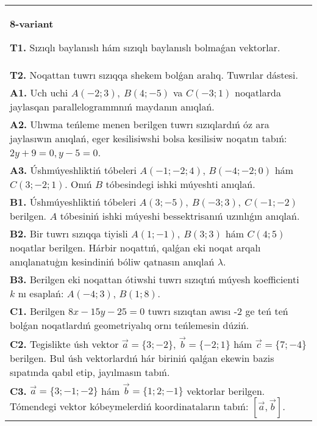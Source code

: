 \documentclass{article}
\begin{document}
\begin{tabular}{m{17cm}}
\textbf{8-variant}

\textbf{T1.} 
Sızıqlı baylanıslı hám sızıqlı baylanıslı bolmaǵan vektorlar.
 \\
\textbf{T2.} 
Noqattan tuwrı sızıqqa shekem bolǵan aralıq. Tuwrılar dástesi.
 \\
\textbf{A1.} 
Uch uchi $A (-2;3), \ B (4;-5) $ va
$C (-3;1)$ noqatlarda jaylasqan parallelogrammnıń maydanın anıqlań.
 \\
\textbf{A2.} 
Ulıwma teńleme menen berilgen tuwrı sızıqlardıń
óz ara jaylasıwın anıqlań, eger kesilisiwshi bolsa kesilisiw noqatın
tabıń: $2y+9=0, y-5=0$.
 \\
\textbf{A3.} 
Úshmúyeshliktiń tóbeleri
$A (- 1; - 2;4) $, $B (- 4; - 2;0) $ hám $C (3; -2;1) $. Onıń $B$ tóbesindegi
ishki múyeshti anıqlań.
 \\
\textbf{B1.} 
Úshmúyeshliktiń tóbeleri
\(A (3;-5),\ B (-3;3),\ C (-1;-2) \) berilgen. $A$ tóbesiniń ishki
múyeshi bessektrisanıń uzınlıǵın anıqlań.
 \\
\textbf{B2.} 
Bir tuwrı sızıqqa tiyisli \(A (1;-1),\ B (3;3) \) hám
\(C (4;5) \) noqatlar berilgen. Hárbir noqattıń, qalǵan eki noqat arqalı anıqlanatuģın kesindiniń bóliw qatnasın anıqlań $\lambda$.
 \\
\textbf{B3.} 
Berilgen eki noqattan ótiwshi tuwrı sızıqtıń múyesh
koefficienti $k$ nı esaplań: $A (-4;3) $, $B (1;8) $.
 \\
\textbf{C1.} 
Berilgen \(8x-15y-25=0\) tuwrı sızıqtan awısı -2 ge teń
teń bolǵan noqatlardıń geometriyalıq ornı teńlemesin dúziń.
 \\
\textbf{C2.} 
Tegislikte úsh vektor $\vec{a} = \{ 3; - 2\}$, $\vec{b} = \{ - 2;1\}$ hám $\vec{c} = \{ 7; - 4\}$ berilgen. Bul úsh vektorlardıń hár biriniń qalǵan ekewin bazis sıpatında qabıl etip, jayılmasın tabıń.
 \\
\textbf{C3.} 
$\vec{a} = \{ 3; - 1; - 2\}$ hám $\vec{b} = \{ 1;2; - 1\}$ vektorlar berilgen. Tómendegi vektor kóbeymelerdiń koordinataların tabıń:
$\left\lbrack \vec{a},\vec{b} \right\rbrack$.
 \\

\end{tabular}
\vspace{1cm}
\end{document}
